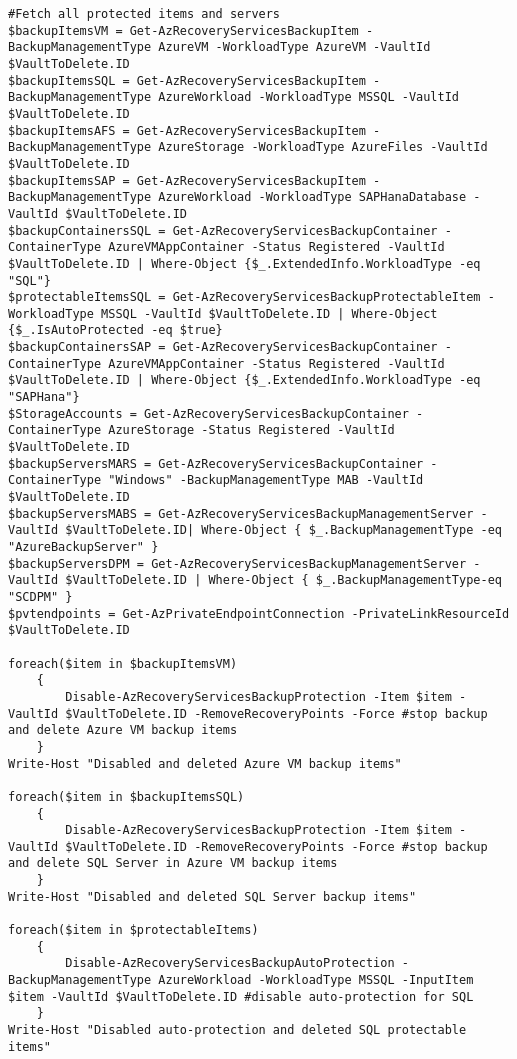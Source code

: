 \begin{verbatim}
#Fetch all protected items and servers
$backupItemsVM = Get-AzRecoveryServicesBackupItem -BackupManagementType AzureVM -WorkloadType AzureVM -VaultId $VaultToDelete.ID
$backupItemsSQL = Get-AzRecoveryServicesBackupItem -BackupManagementType AzureWorkload -WorkloadType MSSQL -VaultId $VaultToDelete.ID
$backupItemsAFS = Get-AzRecoveryServicesBackupItem -BackupManagementType AzureStorage -WorkloadType AzureFiles -VaultId $VaultToDelete.ID
$backupItemsSAP = Get-AzRecoveryServicesBackupItem -BackupManagementType AzureWorkload -WorkloadType SAPHanaDatabase -VaultId $VaultToDelete.ID
$backupContainersSQL = Get-AzRecoveryServicesBackupContainer -ContainerType AzureVMAppContainer -Status Registered -VaultId $VaultToDelete.ID | Where-Object {$_.ExtendedInfo.WorkloadType -eq "SQL"}
$protectableItemsSQL = Get-AzRecoveryServicesBackupProtectableItem -WorkloadType MSSQL -VaultId $VaultToDelete.ID | Where-Object {$_.IsAutoProtected -eq $true}
$backupContainersSAP = Get-AzRecoveryServicesBackupContainer -ContainerType AzureVMAppContainer -Status Registered -VaultId $VaultToDelete.ID | Where-Object {$_.ExtendedInfo.WorkloadType -eq "SAPHana"}
$StorageAccounts = Get-AzRecoveryServicesBackupContainer -ContainerType AzureStorage -Status Registered -VaultId $VaultToDelete.ID
$backupServersMARS = Get-AzRecoveryServicesBackupContainer -ContainerType "Windows" -BackupManagementType MAB -VaultId $VaultToDelete.ID
$backupServersMABS = Get-AzRecoveryServicesBackupManagementServer -VaultId $VaultToDelete.ID| Where-Object { $_.BackupManagementType -eq "AzureBackupServer" }
$backupServersDPM = Get-AzRecoveryServicesBackupManagementServer -VaultId $VaultToDelete.ID | Where-Object { $_.BackupManagementType-eq "SCDPM" }
$pvtendpoints = Get-AzPrivateEndpointConnection -PrivateLinkResourceId $VaultToDelete.ID

foreach($item in $backupItemsVM)
    {
        Disable-AzRecoveryServicesBackupProtection -Item $item -VaultId $VaultToDelete.ID -RemoveRecoveryPoints -Force #stop backup and delete Azure VM backup items
    }
Write-Host "Disabled and deleted Azure VM backup items"

foreach($item in $backupItemsSQL)
    {
        Disable-AzRecoveryServicesBackupProtection -Item $item -VaultId $VaultToDelete.ID -RemoveRecoveryPoints -Force #stop backup and delete SQL Server in Azure VM backup items
    }
Write-Host "Disabled and deleted SQL Server backup items"

foreach($item in $protectableItems)
    {
        Disable-AzRecoveryServicesBackupAutoProtection -BackupManagementType AzureWorkload -WorkloadType MSSQL -InputItem $item -VaultId $VaultToDelete.ID #disable auto-protection for SQL
    }
Write-Host "Disabled auto-protection and deleted SQL protectable items"


\end{verbatim}
